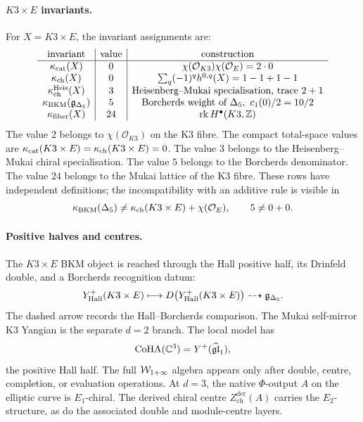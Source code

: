 \paragraph{\(K3\times E\) invariants.}
For \(X=K3\times E\), the invariant assignments are:
\[
\begin{array}{c|c|c}
\text{invariant} & \text{value} & \text{construction} \\ \hline
\kappa_{\mathrm{cat}}(X) & 0 & \chi(\mathcal O_{K3})\chi(\mathcal O_E)=2\cdot 0 \\
\kappa_{\mathrm{ch}}(X) & 0 & \sum_q(-1)^q h^{0,q}(X)=1-1+1-1 \\
\kappa_{\mathrm{ch}}^{\mathrm{Heis}}(X) & 3 &
  \text{Heisenberg--Mukai specialisation, trace }2+1 \\
\kappa_{\mathrm{BKM}}(\mathfrak{g}_{\Delta_5}) & 5 &
  \text{Borcherds weight of }\Delta_5,\ c_1(0)/2=10/2 \\
\kappa_{\mathrm{fiber}}(X) & 24 & \mathrm{rk}\,H^\bullet(K3,\mathbb Z)
\end{array}
\]
The value \(2\) belongs to \(\chi(\mathcal O_{K3})\) on the K3 fibre.
The compact total-space values are
\(\kappa_{\mathrm{cat}}(K3\times E)=\kappa_{\mathrm{ch}}(K3\times E)=0\).  The value \(3\) belongs to the
Heisenberg--Mukai chiral specialisation.  The value \(5\) belongs to the
Borcherds denominator.  The value \(24\) belongs to the Mukai lattice of
the K3 fibre.  These rows have independent definitions; the
incompatibility with an additive rule is visible in
\[
  \kappa_{\mathrm{BKM}}(\Delta_5)\ne \kappa_{\mathrm{ch}}(K3\times E)+\chi(\mathcal O_E),
  \qquad
  5\ne 0+0.
\]

\paragraph{Positive halves and centres.}
The \(K3\times E\) BKM object is reached through the Hall positive half,
its Drinfeld double, and a Borcherds recognition datum:
\[
  Y^+_{\mathrm{Hall}}(K3\times E)
  \longmapsto
  D\bigl(Y^+_{\mathrm{Hall}}(K3\times E)\bigr)
  \dashrightarrow
  \mathfrak{g}_{\Delta_5} .
\]
The dashed arrow records the Hall--Borcherds comparison.  The Mukai
self-mirror K3 Yangian is the separate \(d=2\) branch.  The local model
has
\[
  \mathrm{CoHA}(\mathbb C^3)=Y^+(\widehat{\mathfrak{gl}}_1),
\]
the positive Hall half.  The full \(\mathcal W_{1+\infty}\) algebra appears only after
double, centre, completion, or evaluation operations.  At \(d=3\), the
native \(\Phi\)-output \(A\) on the elliptic curve is \(E_1\)-chiral.
The derived chiral centre \(Z_{\mathrm{ch}}^{\mathrm{der}}(A)\) carries
the \(E_2\)-structure, as do the associated double and module-centre
layers.


